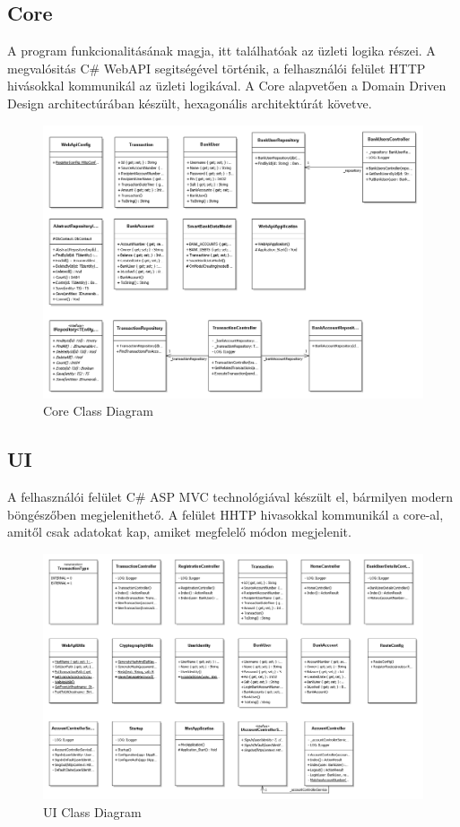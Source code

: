 \documentclass{article}
\begin{document}
\subsection{Core}
A program funkcionalitásának magja, itt találhatóak az üzleti logika részei. A megvalósitás C\# WebAPI segitségével történik, a felhasználói felület HTTP hivásokkal kommunikál az üzleti logikával. A Core alapvetően a Domain Driven Design architectúrában készült, hexagonális architektúrát követve.
\begin{figure}[h]
	\caption{Core Class Diagram}
	\includegraphics[scale=0.5]{SmartBankCore}
\end{figure}
\subsection{UI}
A felhasználói felület C\# ASP MVC technológiával készült el, bármilyen modern böngészőben megjelenithető. A felület HHTP hivasokkal kommunikál a core-al, amitől csak adatokat kap, amiket megfelelő módon megjelenit.
\begin{figure}[h]
	\caption{UI Class Diagram}
	\includegraphics[scale=0.4]{SmartBankUI}
\end{figure}
\pagebreak
\end{document}
